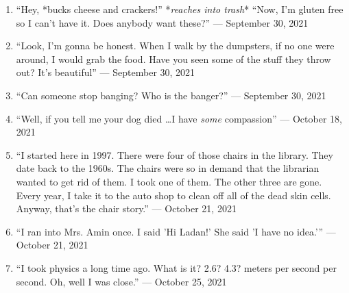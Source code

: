\documentclass[12pt]{article}
\begin{document}
\begin{enumerate}
      \item “Hey, *bucks cheese and crackers!” *\textit{reaches into trash}* “Now, I'm gluten free so I can't have it. Does anybody want these?” — September 30, 2021

      \item “Look, I'm gonna be honest. When I walk by the dumpsters, if no one were around, I would grab the food. Have you seen some of the stuff they throw out? It's beautiful” — September 30, 2021

      \item “Can someone stop banging? Who is the banger?” — September 30, 2021

      \item “Well, if you tell me your dog died \dots I have \textit{some} compassion” — October 18, 2021

      \item “I started here in 1997. There were four of those chairs in the library. They date back to the 1960s. The chairs were so in demand that the librarian wanted to get rid of them. I took one of them. The other three are gone. Every year, I take it to the auto shop to clean off all of the dead skin cells. Anyway, that's the chair story.” — October 21, 2021

      \item “I ran into Mrs. Amin once. I said 'Hi Ladan!' She said 'I have no idea.'” — October 21, 2021 

      \item “I took physics a long time ago. What is it? 2.6? 4.3? meters per second per second. Oh, well I was close.” — October 25, 2021

\end{enumerate}
\end{document}
